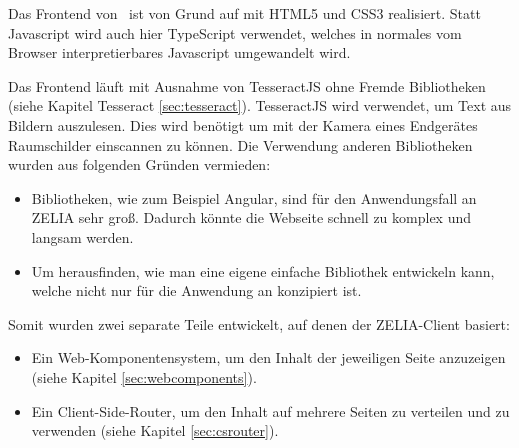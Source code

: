 Das Frontend von \ZELIA\ ist von Grund auf mit HTML5 und CSS3 realisiert. Statt Javascript wird auch hier TypeScript verwendet, welches in normales vom Browser interpretierbares Javascript umgewandelt wird. 

Das Frontend läuft mit Ausnahme von TesseractJS ohne Fremde Bibliotheken (siehe Kapitel Tesseract \ref{sec:tesseract}). TesseractJS wird verwendet, um Text aus Bildern auszulesen. Dies wird benötigt um mit der Kamera eines Endgerätes Raumschilder einscannen zu können. Die Verwendung anderen Bibliotheken wurden aus folgenden Gründen vermieden:
\begin{itemize}
    \item Bibliotheken, wie zum Beispiel Angular, sind für den Anwendungsfall an ZELIA sehr groß. Dadurch könnte die Webseite schnell zu komplex und langsam werden.
    \item Um herausfinden, wie man eine eigene einfache Bibliothek entwickeln kann, welche nicht nur für die Anwendung an \ZELIA konzipiert ist.
\end{itemize}

Somit wurden zwei separate Teile entwickelt, auf denen der ZELIA-Client basiert:

\begin{itemize}
    \item Ein Web-Komponentensystem, um den Inhalt der jeweiligen Seite anzuzeigen (siehe Kapitel \ref{sec:webcomponents}).
    \item Ein Client-Side-Router, um den Inhalt auf mehrere Seiten zu verteilen und zu verwenden (siehe Kapitel \ref{sec:csrouter}).
\end{itemize}

